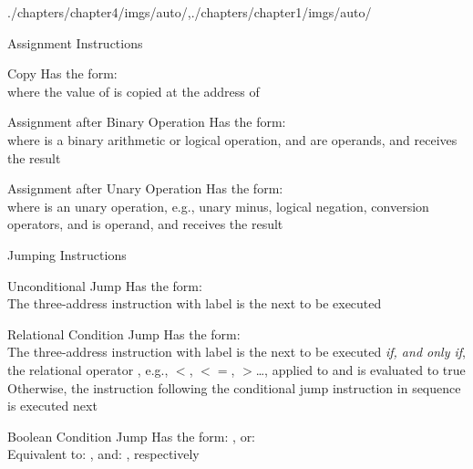 \begin{graphicspathcontext}{{./chapters/chapter4/imgs/auto/},{./chapters/chapter1/imgs/auto/}}
\begin{bibunit}[apalike]
\begin{frame}{Assignment Instructions}
	\begin{definitionblock}{Copy}
		Has the form: \emph{} \\
		where the value of  is copied at the address of 
	\end{definitionblock}
	\begin{definitionblock}{Assignment after Binary Operation}
		Has the form: \emph{} \\
		where  is a binary arithmetic or logical operation,  and  are operands, and  receives the result
	\end{definitionblock}
	\begin{definitionblock}{Assignment after Unary Operation}
		Has the form: \emph{} \\
		where  is an unary operation, e.g., unary minus, logical negation, conversion operators, and  is operand, and  receives the result
	\end{definitionblock}
\end{frame}

\begin{frame}[t]{Jumping Instructions}
	\begin{definitionblock}{Unconditional Jump}
		Has the form: \emph{} \\
		The three-address instruction with label  is the next to be executed
	\end{definitionblock}
	\begin{definitionblock}{Relational Condition Jump}
		Has the form: \emph{} \\
		The three-address instruction with label  is the next to be executed \emph{if, and only if}, the relational operator , e.g., $<$, $<=$, $>$\dots, applied to  and  is evaluated to true \\
		Otherwise, the instruction following the conditional jump instruction in sequence is executed next
	\end{definitionblock}
	\begin{definitionblock}{Boolean Condition Jump}
		Has the form: \emph{}, or: \emph{} \\
		Equivalent to: , and: , respectively
	\end{definitionblock}
\end{frame}


\end{bibunit}
\end{graphicspathcontext}
